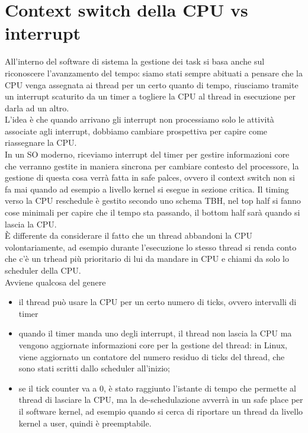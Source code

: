 \documentclass[12pt, oneside]{extbook}
\begin{document}
\section{Context switch della CPU vs interrupt}
All'interno del software di sistema la gestione dei task si basa anche sul riconoscere l'avanzamento del tempo: siamo stati sempre abituati a pensare che la CPU venga assegnata ai thread per un certo quanto di tempo, riusciamo tramite un interrupt scaturito da un timer a togliere la CPU al thread in esecuzione per darla ad un altro.\\ L'idea è che quando arrivano gli interrupt non processiamo solo le attività associate agli interrupt, dobbiamo cambiare prospettiva per capire come riassegnare la CPU.\\In un SO moderno, riceviamo interrupt del timer per gestire informazioni core che verranno gestite in maniera sincrona per cambiare contesto del processore, la gestione di questa cosa verrà fatta in safe palces, ovvero il context switch non si fa mai quando ad esempio a livello kernel si esegue in sezione critica. Il timing verso la CPU reschedule è gestito secondo uno schema TBH, nel top half si fanno cose minimali per capire che il tempo sta passando, il bottom half sarà quando si lascia la CPU.\\È differente da considerare il fatto che un thread abbandoni la CPU volontariamente, ad esempio durante l'esecuzione lo stesso thread si renda conto che c'è un trhead più prioritario di lui da mandare in CPU e chiami da solo lo scheduler della CPU.\\Avviene qualcosa del genere
\begin{itemize}
\item il thread può usare la CPU per un certo numero di ticks, ovvero intervalli di timer
\item quando il timer manda uno degli interrupt, il thread non lascia la CPU ma vengono aggiornate informazioni core per la gestione del thread: in Linux, viene aggiornato un contatore del numero residuo di ticks del thread, che sono stati scritti dallo scheduler all'inizio;
\item se il tick counter va a 0, è stato raggiunto l'istante di tempo che permette al thread di lasciare la CPU, ma la de-schedulazione avverrà in un safe place per il software kernel, ad esempio quando si cerca di riportare un thread da livello kernel a user, quindi è preemptabile.
\end{itemize}
\end{document}
